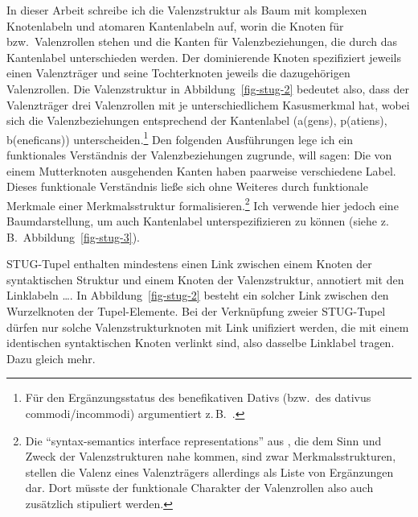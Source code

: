 In dieser Arbeit schreibe ich die Valenzstruktur als Baum mit komplexen Knotenlabeln und atomaren Kantenlabeln auf, worin die Knoten für  bzw.\ Valenzrollen stehen und die Kanten für Valenzbeziehungen, die durch das Kantenlabel unterschieden werden. Der dominierende Knoten spezifiziert jeweils einen Valenzträger und seine Tochterknoten jeweils die dazugehörigen Valenzrollen. Die Valenzstruktur in Abbildung~\ref{fig-stug-2} bedeutet also, dass der Valenzträger drei Valenzrollen mit je unterschiedlichem Kasusmerkmal hat, wobei sich die Valenzbeziehungen entsprechend der Kantenlabel ({\sc a(gens), p(atiens), b(eneficans)}) unterscheiden.\footnote{Für den Ergänzungsstatus des benefikativen Dativs (bzw.\ des dativus commodi/incommodi) argumentiert z.\,B.\ \citet[115]{Wegener:85}.} Den folgenden Ausführungen lege ich ein funktionales Verständnis der Valenzbeziehungen zugrunde, will sagen: Die von einem Mutterknoten ausgehenden Kanten haben paarweise verschiedene Label. Dieses funktionale Verständnis lie\ss e sich ohne Weiteres durch funktionale Merkmale einer Merkmalsstruktur formalisieren.\footnote{Die "`syntax-semantics interface representations"' aus \cite{Hahn:Meurers:11}, die dem Sinn und Zweck der Valenzstrukturen nahe kommen, sind zwar Merkmalsstrukturen, stellen die Valenz eines Valenzträgers allerdings als Liste von Ergänzungen dar. Dort müsste der funktionale Charakter der Valenzrollen also auch zusätzlich stipuliert werden.} Ich verwende hier jedoch eine Baumdarstellung, um auch Kantenlabel unterspezifizieren zu können (siehe z.\,B.\ Abbildung~\ref{fig-stug-3}).

STUG-Tupel enthalten mindestens einen Link zwischen einem Knoten der syntaktischen Struktur und einem Knoten der Valenzstruktur, annotiert mit den Linklabeln  \ldots {}. In Abbildung~\ref{fig-stug-2} besteht ein solcher Link zwischen den Wurzelknoten der Tupel-Elemente. Bei der Verknüpfung zweier STUG-Tupel dürfen nur solche Valenzstrukturknoten mit Link unifiziert werden, die mit einem identischen syntaktischen Knoten verlinkt sind, also dasselbe Linklabel tragen. Dazu gleich mehr. 

